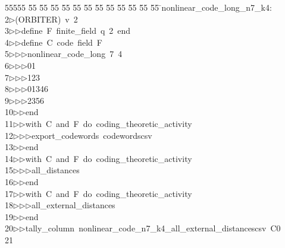 %
%
\begin{tabbing}
55555 \= 55 \= 55 \= 55 \= 55 \= 55 \= 55 \= 55 \= 55 \= 55 \= 55 \= 55 \= 55 \= \>nonlinear\_code\_long\_n7\_k4:\\[0pt]
2\>$\triangleright$\>(ORBITER)\ v\ 2\ \\[0pt]
3\>$\triangleright$\>$\triangleright$\>define\ F\ finite\_field\ q\ 2\ end\ \\[0pt]
4\>$\triangleright$\>$\triangleright$\>define\ C\ code\ field\ F\ \\[0pt]
5\>$\triangleright$\>$\triangleright$\>$\triangleright$\>nonlinear\_code\_long\ 7\ 4\ \\[0pt]
6\>$\triangleright$\>$\triangleright$\>$\triangleright$\>01\ \\[0pt]
7\>$\triangleright$\>$\triangleright$\>$\triangleright$\>123\ \\[0pt]
8\>$\triangleright$\>$\triangleright$\>$\triangleright$\>01346\ \\[0pt]
9\>$\triangleright$\>$\triangleright$\>$\triangleright$\>2356\ \\[0pt]
10\>$\triangleright$\>$\triangleright$\>end\ \\[0pt]
11\>$\triangleright$\>$\triangleright$\>with\ C\ and\ F\ do\ coding\_theoretic\_activity\ \\[0pt]
12\>$\triangleright$\>$\triangleright$\>$\triangleright$\>export\_codewords\ codewordscsv\ \\[0pt]
13\>$\triangleright$\>$\triangleright$\>end\ \\[0pt]
14\>$\triangleright$\>$\triangleright$\>with\ C\ and\ F\ do\ coding\_theoretic\_activity\ \\[0pt]
15\>$\triangleright$\>$\triangleright$\>$\triangleright$\>all\_distances\ \\[0pt]
16\>$\triangleright$\>$\triangleright$\>end\ \\[0pt]
17\>$\triangleright$\>$\triangleright$\>with\ C\ and\ F\ do\ coding\_theoretic\_activity\ \\[0pt]
18\>$\triangleright$\>$\triangleright$\>$\triangleright$\>all\_external\_distances\ \\[0pt]
19\>$\triangleright$\>$\triangleright$\>end\ \\[0pt]
20\>$\triangleright$\>$\triangleright$\>tally\_column\ nonlinear\_code\_n7\_k4\_all\_external\_distancescsv\ C0\\[0pt]
21\>\end{tabbing}

